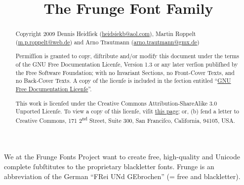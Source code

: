 \documentclass[
  ngerman,
  titlepage=no
]{scrartcl}
\title{The Frunge Font Family}
\author{\team}
\let\addpart\addsec   %
\begin{document}
\begin{comment}
Engliſh long s rules:
End of word: s / Elſe: ſ
with f: sf/fs
with daſh at line end: ſ-
with apostrophe: s’
Italic writing: ſſ -> ſs
17th century: ſb ſk -> sb sk
\end{comment}

\begin{comment}
This document is free ſoftware: you can rediſtribute it and/or
modify it under the terms of the GNU General Public Licenſe as publiſhed by the
Free Software Foundation, either verſion 3 of the Licenſe, or (at your option)
any later verſion.

This document is diſtributed in the hope that it will be uſeful,
but WITHOUT ANY WARRANTY; without even the implied warranty of MERCHANTABILITY
or FITNESS FOR A PARTICULAR PURPOSE. See the GNU General Public Licenſe for more
details.

You ſhould have received a copy of the GNU General Public Licenſe
along with this document. If not, see: http://www.gnu.org/licenses/gpl.html
\end{comment}

\maketitle
\thispagestyle{empty}
\begin{abstract}
\large
Copyright 2009
Dennis Heidſiek (\href{mailto:heidsiekb@aol.com}{heidsiekb@aol.com}),
Martin Roppelt \break(\href{mailto:m.p.roppelt@web.de}{m.p.roppelt@web.de}) and
Arno Trautmann (\href{mailto:arno.trautmann@gmx.de}{arno.trautmann@gmx.de})

Permiſſion is granted to copy, diſtribute and/or modify this
document under the terms of the GNU Free Documentation Licenſe, Version 1.3 or
any later verſion publiſhed by the Free Software Foundation; with no Invariant
Sections, no Front-Cover Texts, and no Back-Cover Texts. A copy of the licenſe
is included in the ſection entitled “\hyperlink{fdl}{GNU Free Documentation
Licenſe}”.

This work is licenſed under the Creative Commons
Attribution-ShareAlike 3.0 Unported Licenſe. To view a copy of this licenſe,
viſit \href{http://creativecommons.org/licenses/by-sa/3.0/legalcode}{this page}; or, (b) ſend a letter
to Creative Commons, 171 2\textsuperscript{nd} Street, Suite 300, San Franciſco, California,
94105, USA.
\end{abstract}
\clearpage
\tableofcontents
\addpart{Frunge Fonts Project}
We at the Frunge Fonts Project want to create free, high-quality and Unicode
complete ſubſtitutes to the proprietary blackletter fonts. Frunge is an
abbreviation of the German “FRei UNd GEbrochen” (= free and blackletter).
\end{document}
